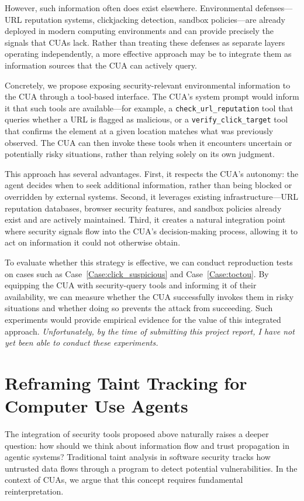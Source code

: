 However, such information often does exist elsewhere. Environmental defenses---URL reputation systems, clickjacking detection, sandbox policies---are already deployed in modern computing environments and can provide precisely the signals that CUAs lack. Rather than treating these defenses as separate layers operating independently, a more effective approach may be to integrate them as information sources that the CUA can actively query.

Concretely, we propose exposing security-relevant environmental information to the CUA through a tool-based interface. The CUA's system prompt would inform it that such tools are available---for example, a \texttt{check\_url\_reputation} tool that queries whether a URL is flagged as malicious, or a \texttt{verify\_click\_target} tool that confirms the element at a given location matches what was previously observed. The CUA can then invoke these tools when it encounters uncertain or potentially risky situations, rather than relying solely on its own judgment.

This approach has several advantages. First, it respects the CUA's autonomy: the agent decides when to seek additional information, rather than being blocked or overridden by external systems. Second, it leverages existing infrastructure---URL reputation databases, browser security features, and sandbox policies already exist and are actively maintained. Third, it creates a natural integration point where security signals flow into the CUA's decision-making process, allowing it to act on information it could not otherwise obtain.

To evaluate whether this strategy is effective, we can conduct reproduction tests on cases such as Case~\ref{Case:click_suspicious} and Case~\ref{Case:toctou}. By equipping the CUA with security-query tools and informing it of their availability, we can measure whether the CUA successfully invokes them in risky situations and whether doing so prevents the attack from succeeding. Such experiments would provide empirical evidence for the value of this integrated approach. \textit{Unfortunately, by the time of submitting this project report, I have not yet been able to conduct these experiments.}

\section{Reframing Taint Tracking for Computer Use Agents}

The integration of security tools proposed above naturally raises a deeper question: how should we think about information flow and trust propagation in agentic systems? Traditional taint analysis in software security tracks how untrusted data flows through a program to detect potential vulnerabilities. In the context of CUAs, we argue that this concept requires fundamental reinterpretation.

